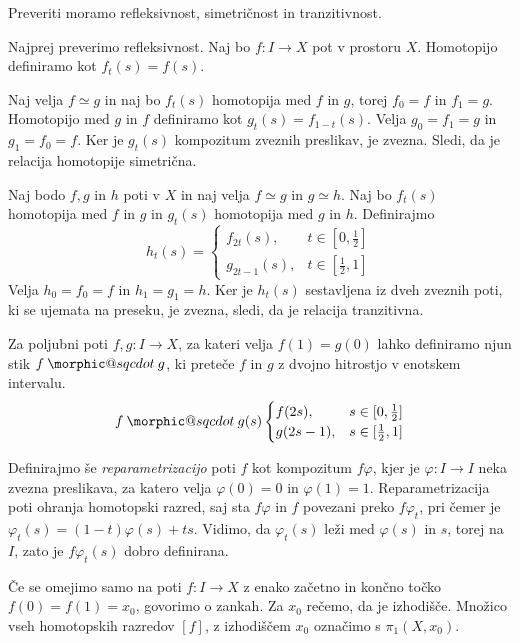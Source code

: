 \documentclass[mat1]{fmfdelo}
\makeatletter
\DeclareRobustCommand{\sqcdot}{\mathbin{\mathpalette\morphic@sqcdot\relax}}
\newcommand{\morphic@sqcdot}[2]{%
\sbox\z@{$\m@th#1\centerdot$}%
\ht\z@=.33333\ht\z@
\vcenter{\box\z@}%
}
\makeatother
\begin{document}
\begin{dokaz}
    Preveriti moramo refleksivnost, simetričnost in tranzitivnost.

    Najprej preverimo refleksivnost. Naj bo $f \colon  I \rightarrow X$ pot v prostoru $X$. Homotopijo definiramo kot $f_t(s)=f(s)$.
    
    Naj velja $f \simeq g$ in naj bo $f_t(s)$ homotopija med $f$ in $g$, 
    torej $f_0=f$ in $f_1=g$. Homotopijo med $g$ in $f$ definiramo kot 
    $g_t(s)=f_{1-t}(s)$. Velja $g_0=f_1=g$ in $g_1=f_0=f$. Ker je 
    $g_t(s)$ kompozitum zveznih preslikav, je zvezna. Sledi, da je 
    relacija homotopije simetrična.
    
    Naj bodo $f, g \text{ in } h$ poti v $X$ in naj velja $f \simeq g$ 
    in $g \simeq h$. Naj bo $f_t(s)$ homotopija med $f$ in $g$ in 
    $g_t(s)$ homotopija med $g$ in $h$. Definirajmo 
    $$h_t(s)=\begin{cases}
        f_{2t}(s), & t \in [0,\frac{1}{2}] \\
        g_{2t-1}(s), & t \in [\frac{1}{2},1]
    \end{cases}
    $$
    Velja $h_0=f_0=f$ in $h_1=g_1=h$. Ker je $h_t(s)$ sestavljena iz dveh zveznih poti, ki se ujemata na preseku, je zvezna, sledi, da je relacija tranzitivna.
\end{dokaz}

Za poljubni poti $f,g \colon  I \rightarrow X$, za kateri velja $f(1) = g(0)$ 
lahko definiramo njun stik $f \sqcdot g$, ki preteče $f$ in $g$ z dvojno 
hitrostjo v enotskem intervalu.
$$ f \sqcdot g(s) \begin{cases}
    f(2s), &s \in [0,\frac{1}{2}] \\
    g(2s-1), & s \in [\frac{1}{2},1]
\end{cases}
$$

Definirajmo še \textit{reparametrizacijo} poti $f$ kot kompozitum $f 
    \varphi$, kjer je $\varphi\colon  I \rightarrow I$ neka zvezna preslikava, za 
    katero velja $\varphi(0)= 0$ in $\varphi(1)=1$. Reparametrizacija poti 
    ohranja homotopski razred, saj sta $f\varphi$ in $f$ povezani preko 
    $f\varphi_t$, pri čemer je $\varphi_t(s)=(1-t)\varphi(s)+ts$. Vidimo, da 
    $\varphi_t(s)$ leži med $\varphi(s)$ in $s$, torej na $I$, zato je 
    $f\varphi_t(s)$ dobro definirana.



    Če se omejimo samo na poti $f\colon I \rightarrow X$ z enako začetno in končno točko $f(0) = f(1) = x_0$, govorimo o zankah. Za $x_0$ rečemo, da je izhodišče.
    Množico vseh homotopskih razredov $[f]$, z izhodiščem $x_0$ označimo s $\pi_1(X,x_0)$.
    
\end{document}
